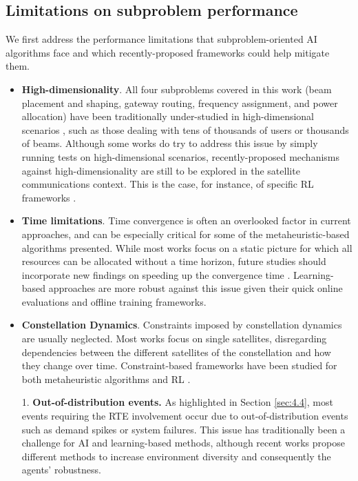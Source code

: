 \documentclass[letterpaper]{article} %
\begin{document}
\subsection{Limitations on subproblem performance}
We first address the performance limitations that subproblem-oriented AI algorithms face and which recently-proposed frameworks could help mitigate them.
\begin{itemize}
\item \textbf{High-dimensionality}. All four subproblems covered in this work (beam placement and shaping, gateway routing, frequency assignment, and power allocation) have been traditionally under-studied in high-dimensional scenarios \cite{Luis2020}, such as those dealing with tens of thousands of users or thousands of beams. Although some works do try to address this issue \cite{hu2020dynamic, Luis2019} by simply running tests on high-dimensional scenarios, recently-proposed mechanisms against high-dimensionality are still to be explored in the satellite communications context. This is the case, for instance, of specific RL frameworks \cite{van2020q, zahavy2018learn}.

\item \textbf{Time limitations}. Time convergence is often an overlooked factor in current approaches, and can be especially critical for some of the metaheuristic-based algorithms presented. While most works focus on a static picture for which all resources can be allocated without a time horizon, future studies should incorporate new findings on speeding up the convergence time \cite{nia2009speeding}. Learning-based approaches are more robust against this issue given their quick online evaluations and offline training frameworks.

\item \textbf{Constellation Dynamics}. Constraints imposed by constellation dynamics are usually neglected. Most works focus on single satellites, disregarding dependencies between the different satellites of the constellation and how they change over time. Constraint-based frameworks have been studied for both metaheuristic algorithms \cite{homaifar1994constrained} and RL \cite{garcia2015comprehensive, dalal2018safe, Bohez2019}.

1. \textbf{Out-of-distribution events.} As highlighted in Section \ref{sec:4.4}, most events requiring the RTE involvement occur due to out-of-distribution events such as demand spikes or system failures. This issue has traditionally been a challenge for AI and learning-based methods, although recent works propose different methods to increase environment diversity \cite{Ghosh2017, Lee2019, Tobin2017} and consequently the agents' robustness.
\end{itemize}
\end{document}
